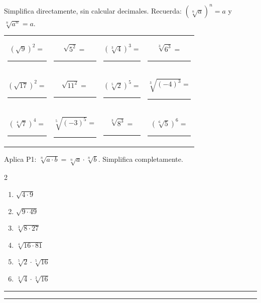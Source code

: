 \documentclass[11pt, letterpaper]{article}
\newcommand{\espacio}[1]{%
  \par\vspace{5pt}%
  \noindent\textcolor{zenitnavy!22}{\rule{\linewidth}{1.2pt}}%
  \par\vspace{#1}%
  \noindent\textcolor{zenitnavy!22}{\rule{\linewidth}{1.2pt}}%
  \par\vspace{5pt}%
  \noindent{\small\textbf{Respuesta:}\;\rule{7cm}{0.35pt}}%
  \par\vspace{2mm}}
\newcommand{\blancoCh}{\;\rule{1.4cm}{0.35pt}\;}
\begin{document}
\begin{tcolorbox}[ejbasico,
  title={Ejercicio 17 \hfill $\bigstar$ \quad Relación inversa}]

Simplifica directamente, sin calcular decimales. Recuerda: $\left(\sqrt[n]{a}\right)^n=a$ y $\sqrt[n]{a^n}=a$.

\medskip

\begin{center}
\renewcommand{\arraystretch}{1.9}
\begin{tabular}{cccc}
$(\sqrt{9})^2=$ \blancoCh & $\sqrt{5^2}=$ \blancoCh & $(\sqrt[3]{4})^3=$ \blancoCh & $\sqrt[3]{6^3}=$ \blancoCh\\[4pt]
$(\sqrt{17})^2=$ \blancoCh & $\sqrt{11^2}=$ \blancoCh & $(\sqrt[5]{2})^5=$ \blancoCh & $\sqrt[3]{(-4)^3}=$ \blancoCh\\[4pt]
$(\sqrt[4]{7})^4=$ \blancoCh & $\sqrt[5]{(-3)^5}=$ \blancoCh & $\sqrt[3]{8^3}=$ \blancoCh & $(\sqrt[6]{5})^6=$ \blancoCh\\
\end{tabular}
\end{center}
\end{tcolorbox}

\vspace{6pt}

\begin{tcolorbox}[ejmedio,
  title={Ejercicio 18 \hfill $\bigstar\bigstar$ \quad Propiedad P1 — raíz de un producto}]

Aplica P1: $\sqrt[n]{a\cdot b}=\sqrt[n]{a}\cdot\sqrt[n]{b}$. Simplifica completamente.

\medskip

\begin{multicols}{2}
\begin{enumerate}[label=\alph*), leftmargin=*]
  \item $\sqrt{4\cdot 9}$
  \item $\sqrt{9\cdot 49}$
  \item $\sqrt[3]{8\cdot 27}$
  \item $\sqrt[4]{16\cdot 81}$
  \item $\sqrt[5]{2}\cdot\sqrt[5]{16}$
  \item $\sqrt[3]{4}\cdot\sqrt[3]{16}$
\end{enumerate}
\end{multicols}

\espacio{5.0cm}
\end{tcolorbox}
\end{document}

